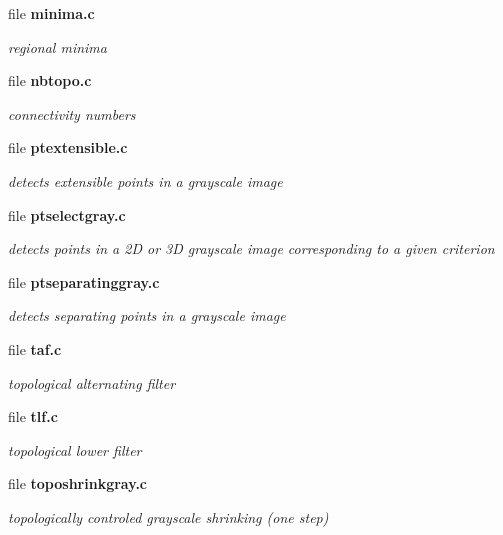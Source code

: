 \begin{CompactItemize}
\item 
file {\bf minima.c}
\begin{CompactList}\small\item\em regional minima \item\end{CompactList}

\item 
file {\bf nbtopo.c}
\begin{CompactList}\small\item\em connectivity numbers \item\end{CompactList}

\item 
file {\bf ptextensible.c}
\begin{CompactList}\small\item\em detects extensible points in a grayscale image \item\end{CompactList}

\item 
file {\bf ptselectgray.c}
\begin{CompactList}\small\item\em detects points in a 2D or 3D grayscale image corresponding to a given criterion \item\end{CompactList}

\item 
file {\bf ptseparatinggray.c}
\begin{CompactList}\small\item\em detects separating points in a grayscale image \item\end{CompactList}

\item 
file {\bf taf.c}
\begin{CompactList}\small\item\em topological alternating filter \item\end{CompactList}

\item 
file {\bf tlf.c}
\begin{CompactList}\small\item\em topological lower filter \item\end{CompactList}

\item 
file {\bf toposhrinkgray.c}
\begin{CompactList}\small\item\em topologically controled grayscale shrinking (one step) \item\end{CompactList}


\end{CompactItemize}
